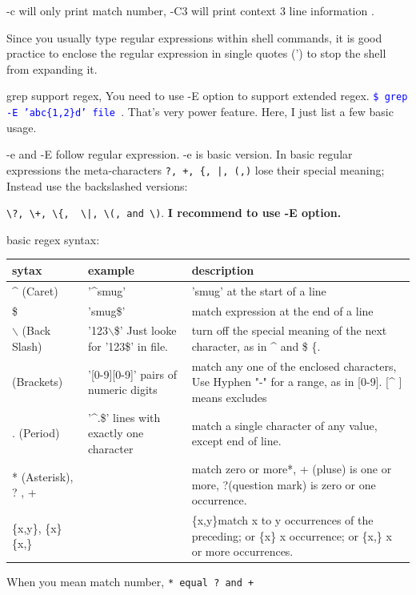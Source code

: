 \documentclass[paper=8.5in:11in, twoside, 12pt, pagesize=pdftex]{book}
\newcommand{\linuxcommand}[1]{\texttt{\textcolor{blue}{\$ #1 \Pisymbol{psy}{191}}}}
\begin{document}
	-c will only print  match number, -C3 will print context 3 line information .  

	Since you usually type regular expressions within shell commands, it is good practice to enclose the regular expression in single quotes (') to stop the shell from expanding it. 

	grep support regex, You need to use -E option to support extended regex. \linuxcommand{grep -E 'abc\{1,2\}d' file}.  That's very power feature. Here, I just list a few basic usage. 

	 -e and -E follow regular expression. -e is basic version. In basic regular expressions the meta-characters \verb=?, +, {, |, (,)= lose their special meaning; Instead use the backslashed versions:
	 	
	 \verb=\?, \+, \{,  \|, \(, and \)=. \textbf{I recommend to use -E option.}

	basic regex syntax:

 \begin{tabular}{p{}|p{}|p{}}
\hline 
sytax 	& example & 	description \\

\hline 
\^{} (Caret)	& '\^{}smug'  & 	'smug' at the start of a line \\
\hline 
\$ &  'smug\$' & 	match expression at the end of a line\\
\hline 
$\backslash$ (Back Slash)&   '123$\backslash$\$'  Just looke for '123\$' in file. &	turn off the special meaning of the next character, as in \^{} and \$ \{.   \\
\hline 
[ ] (Brackets)	&'[0-9][0-9]' pairs of numeric digits &	match any one of the enclosed characters,  Use Hyphen "-" for a range, as in [0-9].  [\^{} ] means excludes\\
\hline 
. (Period) & '\^{}.\$' lines with exactly one character  &	match a single character of any value, except end of line. \\
\hline 
* (Asterisk), ? , + &  &	match zero or more*,  + (pluse) is one or more,   ?(question mark) is zero or one occurrence.   \\
\hline 
\{x,y\}, 	\{x\}	\{x,\} & &	\{x,y\}match x to y occurrences of the preceding;  or \{x\} x occurrence; or  \{x,\} x or more occurrences. \\

\hline 
\end{tabular}

		When you mean match number, \verb=* equal ? and + = 
\end{document}
